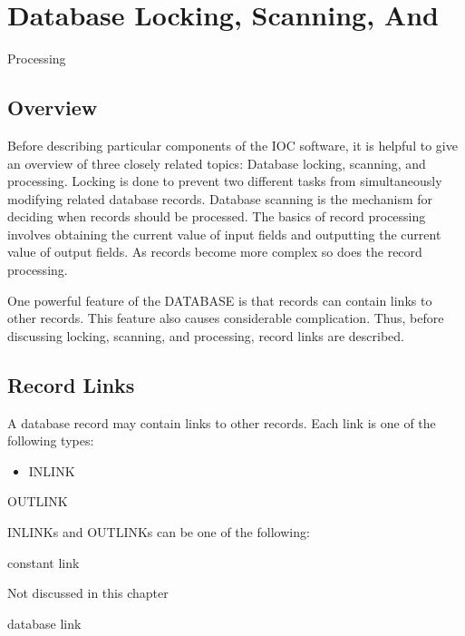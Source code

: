 





\chapter{Database Locking, Scanning, And }
Processing

\section{Overview}

Before describing particular components of the IOC software, it is helpful to give an overview of three closely related 
topics: Database locking, scanning, and processing. Locking is done to prevent two different tasks from simultaneously 
modifying related database records. Database scanning is the mechanism for deciding when records should be processed. 
The basics of record processing  involves obtaining the current value of  input fields and outputting the current value of 
output fields. As records become more complex so does the record processing.

One powerful feature of the DATABASE is that records can contain links to other records. This feature also causes 
considerable complication. Thus, before discussing locking, scanning, and processing, record links are described.

\section{Record Links}

A database record may contain links to other records. Each link is one of the following types:

\begin{itemize}\item {}INLINK

\end{itemize}\begin{description}\item {}OUTLINK

INLINKs and OUTLINKs can be one of the following:

\end{description}constant link

Not discussed in this chapter

database link

